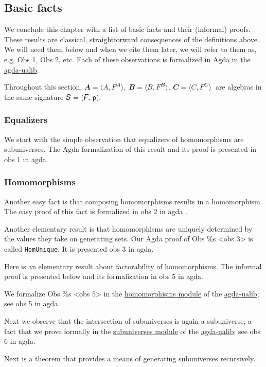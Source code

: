 \documentclass[sigplan,screen]{acmart}
\begin{document}
\subsection{Basic facts}\label{basic-facts}
We conclude this chapter with a list of basic facts and their (informal) proofs. These results are classical, straightforward consequences of the definitions above. We will need them below and when we cite them later, we will refer to them as, e.g, Obs 1, Obs 2, etc. Each of these observations is formalized in Agda in the \href{https://ualib.org}{agda-ualib}.

Throughout this section, \(𝑨 = ⟨A, F^𝑨⟩, \ 𝑩 = ⟨B, F^𝑩⟩, \ 𝑪 = ⟨C, F^𝑪⟩\ \) are algebras in the same signature 𝑆 = (𝐹, ρ).

\subsubsection{Equalizers}\label{equalizers}
We start with the simple observation that equalizers of homomorphisms are subuniverses. The Agda formalization of this result and its proof is presented in obs 1 in agda.

\subsubsection{Homomorphisms}\label{homomorphisms-1}
Another easy fact is that composing homomorphisms results in a homomorphism. The easy proof of this fact is formalized in obs 2 in agda .

Another elementary result is that homomorphisms are uniquely determined by the values they take on generating sets. Our Agda proof of Obs \%s \textless{}obs 3\textgreater{} is called
\texttt{HomUnique}. It is presented obs 3 in agda.


Here is an elementary result about factorability of homomorphisms. The informal proof is presented below and its formalization in obs 5 in agda.

We formalize Obs \%s \textless{}obs 5\textgreater{} in the \href{}{homomorphisms module} of the \href{}{agda-ualib}; see
obs 5 in agda.

Next we observe that the intersection of subuniverses is again a subuniverse, a fact that we prove formally in the \href{}{subuniverses module} of the \href{}{agda-ualib}; see obs 6 in agda.

Next is a theorem that provides a means of generating subuniverses recursively.
\end{document}
